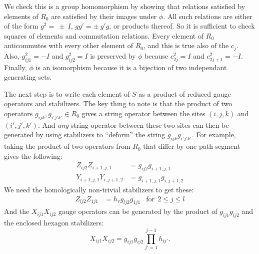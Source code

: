 \documentclass[12pt,notitlepage,longbibliography,nofootinbib,tightenlines]{revtex4}
\begin{document}

We check this is a group homomorphism by showing that relations
satisfied by elements of $R_0$ are satisfied by
their images under $\phi.$
All such relations are either of the form
$g^2=~\pm~I$, $gg'=\pm~g'g$, or
products thereof.
So it is sufficient to check squares of
elements and commutation relations.
Every element of $R_0$ anticommutes with
every other element of $R_0$, and this is true also
of the $c_j.$
Also, $g_{ij1}^2=-I$ and $g_{ij2}^2=I$ 
is preserved by $\phi$ because $c_{2j}^2=I$ and $c_{2j+1}^2=-I$.
Finally, $\phi$ is an isomorphism
because it is a bijection of two independant
generating sets.

The next step is to write each element of $S$
as a product of reduced gauge operators and stabilizers.
The key thing to note is that the product of two
operators $g_{ijk}, g_{i'j'k'}\in R_0$ gives a string
operator between the sites $(i,j,k)$ and $(i',j',k')$.
And {\it any} string operator between these
two sites can then be generated by using stabilizers to
``deform'' the string $g_{ijk}g_{i'j'k'}.$
For example, taking the product
of two operators from $R_0$ that differ
by one path segment gives the following:
\begin{align*}
Z_{ij2}Z_{i+1,j,1} &= g_{ij2} g_{i+1,j,1} \\
Y_{i+1,j,1}Y_{i,j+1,2} &= g_{i+1,j,1}g_{i,j+1,2}
\end{align*}
We need the homologically non-trivial stabilizers to get these:
\begin{align*}
Z_{lj2}Z_{1j1} &= h_v g_{lj2} g_{1j1} &\mbox{for}\ \  2\le j\le l
\end{align*}
And the $X_{ij1}X_{ij2}$
gauge operators can be generated
by the product of 
$g_{ij1}g_{ij2}$ and the enclosed hexagon stabilizers:
$$X_{ij1}X_{ij2}=g_{ij1}g_{ij2}\prod_{j'=1}^{j-1} h_{ij'}.$$
\end{document}
